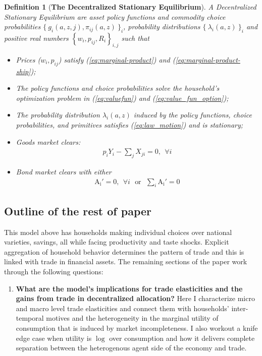 \documentclass[12pt,pdftex]{article}
\newtheorem{df}{Definition}
\begin{document}
\begin{onehalfspacing}
\begin{df}[\textbf{The Decentralized Stationary Equilibrium}] \normalfont A Decentralized Stationary Equilibrium are asset policy functions and commodity choice probabilities $\{\  g_{i}(a, z, j), \pi_{ij}(a, z) \ \}_{i}$, probability distributions $\{ \ \lambda_i(a, z) \ \}_{i}$ and positive real numbers $\left \{w_i, p_{ij}, R_i\right \}_{i,j}$ such that
\begin{itemize}
\item[i]  Prices ($w_i, p_{ij}$) satisfy (\ref{eq:marginal-product}) and (\ref{eq:marginal-product-ship});
\item[ii] The policy functions and choice probabilities solve the household's optimization problem in (\ref{eq:valuefun}) and (\ref{eq:value_fun_option});
\item[iii] The probability distribution $\lambda_i(a, z)$ induced by the policy functions, choice probabilities, and primitives satisfies (\ref{eq:law_motion}) and is stationary;
\item[iv] Goods market clears:
\begin{align}
p_{i} Y_{i} - \sum_{j}  X_{ji} = 0, \ \ \forall i
\end{align}
\item[v] Bond market clears with either
\begin{align}
\mathrm{A_i'} = 0, \ \ \forall i \ \ \ \mbox{or} \ \ \ \sum_{i}\mathrm{A_i'} = 0
\label{eq:fa-condition}
\end{align}
\end{itemize}
\end{df}


\subsection{Outline of the rest of paper}

This model above has households making individual choices over national varieties, savings, all while facing productivity and taste shocks. Explicit aggregation of household behavior determines the pattern of trade and this is linked with trade in financial assets.  The remaining sections of the paper work through the following questions:
\begin{enumerate}
\item \textbf{What are the model's implications for trade elasticities and the gains from trade in decentralized allocation?} Here I characterize micro and macro level trade elasticities and connect them with households' inter-temporal motives and the heterogeneity in the marginal utility of consumption that is induced by market incompleteness. I also workout a knife edge case when utility is $\log$ over consumption and how it delivers complete separation between the heterogenous agent side of the economy and trade.


\end{enumerate}
\end{onehalfspacing}
\end{document}
